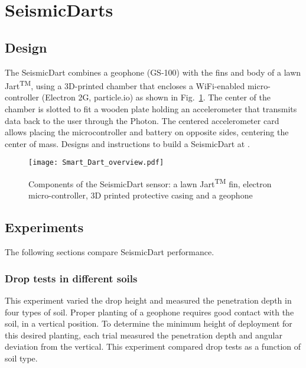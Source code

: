 \section{SeismicDarts}\label{sec:SeismicDarts}

\subsection{Design}

The SeismicDart combines a geophone (GS-100) with the fins and body of a lawn Jart\textsuperscript{TM}, using a 3D-printed chamber that encloses a WiFi-enabled micro-controller (Electron 2G, particle.io) as shown in Fig.~\ref{fig:Smart_Dart_overview}. 
The center of the chamber is slotted to fit a wooden plate holding an accelerometer that transmits data back to the user through the Photon. 
The centered accelerometer card allows placing the microcontroller and battery on opposite sides, centering the center of mass.
Designs and instructions to build a SeismicDart at \cite{Victor2016Thingiverse}.



\begin{figure} \centering
{\texttt{[image: Smart\_Dart\_overview.pdf]}}
\caption{Components of the SeismicDart sensor: a lawn  Jart\textsuperscript{TM} fin, electron micro-controller, 3D printed protective casing and a geophone} 
\label{fig:Smart_Dart_overview}
\end{figure}

\subsection{Experiments} 
The following sections compare SeismicDart performance.
\subsubsection{ Drop tests in different soils}  
This experiment varied the drop height and measured the penetration depth in four types of soil. 
Proper planting of a geophone requires good contact with the soil, in a vertical position. 
To determine the minimum height of deployment for this desired planting, each trial measured the penetration depth and angular deviation from the vertical. 
This experiment compared drop tests as a function of soil type. 

